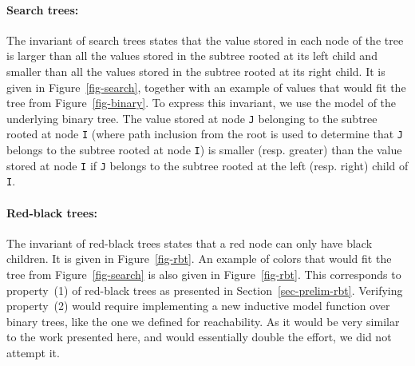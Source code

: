 \documentclass{llncs}
\begin{document}
\paragraph{Search trees:}
The invariant of search trees states that the value stored in each node of the
tree is larger than all the values stored in the subtree rooted at its left
child and smaller than all the values stored in the subtree rooted at its right
child. It is given in Figure~\ref{fig-search}, together with an example of values that would
fit the tree from Figure~\ref{fig-binary}. To express this invariant, we use the model of the
underlying binary tree. The value stored at node \texttt{J} belonging to the subtree
rooted at node \texttt{I} (where path inclusion from the root is used to determine that
\texttt{J} belongs to the subtree rooted at node \texttt{I}) is smaller (resp. greater) than the
value stored at node \texttt{I} if \texttt{J} belongs to the subtree rooted at the left
(resp. right) child of \texttt{I}.

\paragraph{Red-black trees:}
The invariant of red-black trees states that a red node can only have black
children. It is given in Figure~\ref{fig-rbt}. An example of colors that would
fit the tree from Figure~\ref{fig-search} is also given in
Figure~\ref{fig-rbt}.  This corresponds to property~(1) of red-black trees as
presented in Section~\ref{sec-prelim-rbt}. Verifying property~(2) would require
implementing a new inductive model function over binary trees, like the one we
defined for reachability. As it would be very similar to the work presented
here, and would essentially double the effort, we did not attempt it.

\end{document}

